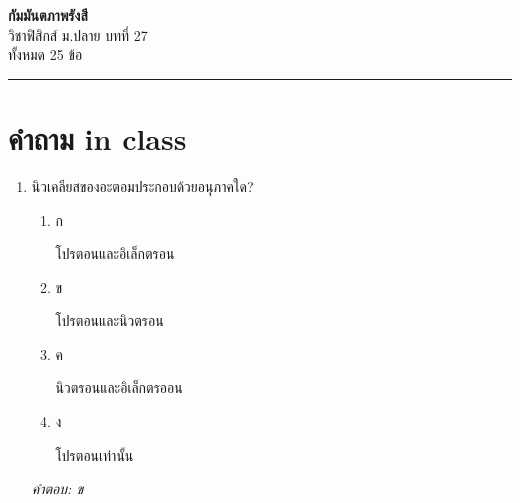\documentclass[12pt]{article}
\begin{document}
\begin{center}
{\Large\textbf{กัมมันตภาพรังสี}}\\[6pt]
{\normalsize วิชาฟิสิกส์ ม.ปลาย บทที่ 27}\\[4pt]
{\footnotesize ทั้งหมด 25 ข้อ}
\end{center}
\hrule
\bigskip

\section*{คำถาม in class}
\begin{enumerate}[label=\arabic*., itemsep=0.5\baselineskip, topsep=0.5\baselineskip, leftmargin=*]
\item นิวเคลียสของอะตอมประกอบด้วยอนุภาคใด?
\begin{enumerate}[label=\alph*)., itemsep=0.3\baselineskip, topsep=0.3\baselineskip]
\item ก\ 
\begin{minipage}[t]{0.9\linewidth}
\raggedright โปรตอนและอิเล็กตรอน
\end{minipage}
\item ข\ 
\begin{minipage}[t]{0.9\linewidth}
\raggedright โปรตอนและนิวตรอน
\end{minipage}
\item ค\ 
\begin{minipage}[t]{0.9\linewidth}
\raggedright นิวตรอนและอิเล็กตรออน
\end{minipage}
\item ง\ 
\begin{minipage}[t]{0.9\linewidth}
\raggedright โปรตอนเท่านั้น
\end{minipage}
\end{enumerate}
\vspace{-0.3\baselineskip}
\begin{small}
\textit{คำตอบ: ข}
\end{small}


\end{enumerate}
\end{document}
